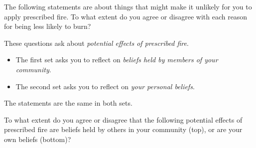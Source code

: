 \documentclass[
  english,
  ]{sdapsclassic}
\begin{document}
\begin{questionnaire}
\vspace{1em}

    \begin{markgroup}[rowsep=0.33em]{The following statements are about things that might make it unlikely for you to apply prescribed fire. To what extent do you agree or disagree with each reason for being less likely to burn? \vspace{1em}}
       {}~{}
       {}~{}
       {}~{}
       {}~{}
       {}~{}
       {}~{}
       {}~{}
       {}~{}
    \end{markgroup}

\vspace{2em} 

\newpage 
These questions ask about \emph{potential effects of prescribed fire}. 

\begin{itemize}
\item The first set asks you to reflect on \emph{beliefs held by members of your community}. 
\item The second set asks you to reflect on \emph{your personal beliefs}. 
\end{itemize}
The statements are the same in both sets.

 To what extent do you agree or disagree that the following potential effects of prescribed fire are beliefs held by others in your community (top), or are your own beliefs (bottom)?
    
    

\end{questionnaire}
\end{document}
